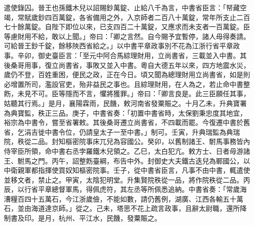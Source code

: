 \begin{pinyinscope}
遣使錄囚。晉王也孫鐵木兒以詔賜鈔萬錠、止給八千為言，中書省臣言：「帑藏空竭，常賦歲鈔四百萬錠，各省備用之外，入京師者二百八十萬錠，常年所支止二百七十餘萬錠。自陛下即位以來，已支四百二十萬錠，又應求而未支者一百萬錠。臣等慮財用不給，敢以上聞。」帝曰：「卿之言然。自今賜予宜暫停，諸人毋得奏請。可給晉王鈔千錠，餘移陜西省給之。」以中書平章政事別不花為江浙行省平章政事。辛卯，御史臺臣言：「至元中阿合馬綜理財用，立尚書省，三載並入中書。其後桑哥用事，復立尚書省，事敗又並入中書。粵自大德五年以來，四方地震水災，歲仍不登，百姓重困，便民之政，正在今日。頃又聞為總理財用立尚書省，如是則必增置所司，濫設官吏，殆非益民之事也。且綜理財用，在人為之，若止命中書整飭，未見不可。臣等隱而不言，懼將獲罪。」帝曰：「卿言良是。此三臣願任其事，姑聽其行焉。」是月，襄陽霖雨，民饑，敕河南省發粟賑之。十月乙未，升典寶署為典寶監，秩正三品。庚子，中書省奏：「初置中書省時，太保劉秉忠度其地宜，裕宗為中書令，嘗至省署敕。其後桑哥遷立尚書省，不四載而罷。今復遷中書於舊省，乞涓吉徙中書令位，仍請皇太子一至中書。」制可。壬寅，升典瑞監為典瑞院，秩從二品。封知樞密院事床兀兒為容國公。癸卯，以舊制諸王、駙馬事務皆內侍宰臣所領，命中書右丞孛羅鐵木兒領之。乙巳，太白犯亢。敕方士、日者毋游諸王、駙馬之門。丙午，詔整飭臺綱，布告中外。封御史大夫鐵古迭兒為鄆國公，以中衛親軍都指揮使買奴知樞密院事。壬子，從中書省臣言，凡事不由中書，輒遣使並移文者，禁止之。甲寅，太陰犯明堂。升集賢院秩從一品，將作院秩從二品。丙辰，以行省平章總督軍馬，得佩虎符，其左丞等所佩悉追納。中書省奏：「常歲海漕糧百四十五萬石，今江浙歲儉，不能如數，請仍舊例，湖廣、江西各輸五十萬石，並由海道達京師。」從之。己未，塔思不花上疏言政事，且辭太尉職，還所降制書及印。是月，杭州、平江水，民饑，發粟賑之。




\end{pinyinscope}
